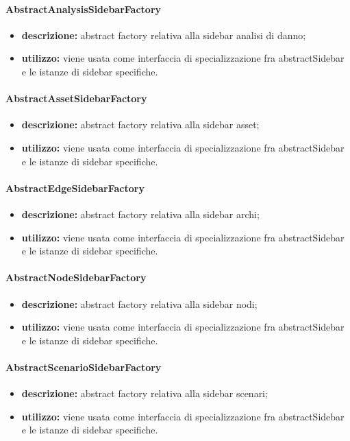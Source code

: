 \paragraph{AbstractAnalysisSidebarFactory}
\begin{itemize}
	\item \textbf{descrizione:} abstract factory relativa alla sidebar analisi di danno;
	\item \textbf{utilizzo:} viene usata come interfaccia di specializzazione fra abstractSidebar e le istanze di sidebar specifiche.
\end{itemize}
\paragraph{AbstractAssetSidebarFactory}
\begin{itemize}
	\item \textbf{descrizione:} abstract factory relativa alla sidebar asset;
	\item \textbf{utilizzo:}  viene usata come interfaccia di specializzazione fra abstractSidebar e le istanze di sidebar specifiche.
\end{itemize}
\paragraph{AbstractEdgeSidebarFactory}
\begin{itemize}
	\item \textbf{descrizione:} abstract factory relativa alla sidebar archi;
	\item \textbf{utilizzo:} viene usata come interfaccia di specializzazione fra abstractSidebar e le istanze di sidebar specifiche.
\end{itemize}
\paragraph{AbstractNodeSidebarFactory}
\begin{itemize}
	\item \textbf{descrizione:} abstract factory relativa alla sidebar nodi;
	\item \textbf{utilizzo:} viene usata come interfaccia di specializzazione fra abstractSidebar e le istanze di sidebar specifiche.
\end{itemize}
\paragraph{AbstractScenarioSidebarFactory}
\begin{itemize}
	\item \textbf{descrizione:} abstract factory relativa alla sidebar scenari;
	\item \textbf{utilizzo:} viene usata come interfaccia di specializzazione fra abstractSidebar e le istanze di sidebar specifiche.
\end{itemize}
